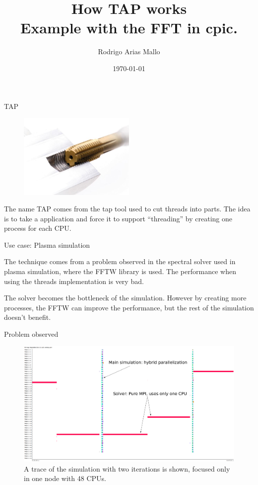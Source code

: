 \documentclass{beamer}
\title{How TAP works\\{\small Example with the FFT in cpic.}}
\author{Rodrigo Arias Mallo}
\institute{Barcelona Supercomputing Center (BSC)}
\date{\today}
\begin{document}
\frame{\titlepage}

\begin{frame}{TAP}


\begin{figure}
\centering
\includegraphics[width=0.5\textwidth]{tap-tool.jpg}
\end{figure}

The name TAP comes from the tap tool used to cut threads into parts. The idea is 
to take a application and force it to support ``threading'' by creating one 
process for each CPU.

\end{frame}

\begin{frame}{Use case: Plasma simulation}

The technique comes from a problem observed in the spectral solver used in 
plasma simulation, where the FFTW library is used. The performance when using 
the threads implementation is very bad.

\vspace{1em}

The solver becomes the bottleneck of the simulation. However by creating more 
processes, the FFTW can improve the performance, but the rest of the simulation 
doesn't benefit.

\end{frame}

\begin{frame}{Problem observed}

\begin{figure}
\centering
\includegraphics[width=\textwidth]{tap/notap}
\caption{A trace of the simulation with two iterations is shown, focused only in 
one node with 48 CPUs.}
\end{figure}


\end{frame}
\end{document}
